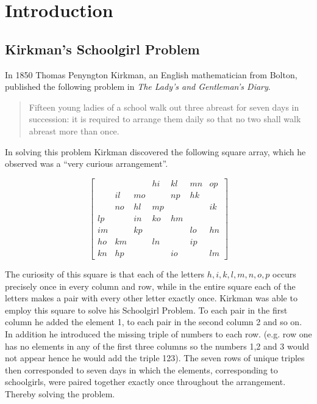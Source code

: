 \chapter{Introduction}
\label{ch:introduction}

\section{Kirkman’s Schoolgirl Problem}

In 1850 Thomas Penyngton Kirkman, an English mathematician from Bolton, published the following problem in \emph{The Lady’s and Gentleman’s Diary}.

\begin{quotation}
Fifteen young ladies of a school walk out three abreast for seven days in succession: it is required to arrange them daily so that no two shall walk abreast more than once.
\end{quotation}

In solving this problem Kirkman discovered the following square array, which he observed was a ``very curious arrangement''.

\begin{equation}
  \begin{bmatrix}
       &    &    & hi & kl & mn & op \\
       & il & mo &    & np & hk &    \\
       & no & hl & mp &    &    & ik \\
    lp &    & in & ko & hm &    &    \\
    im &    & kp &    &    & lo & hn \\
    ho & km &    & ln &    & ip &    \\
    kn & hp &    &    & io &    & lm 
  \end{bmatrix}
  \label{eq:roomsquare}
\end{equation}

The curiosity of this square is that each of the letters
$h, i, k, l, m, n, o, p$
occurs precisely once in every column and row, while in the entire square each of the letters makes a pair with every other letter exactly once.
Kirkman was able to employ this square to solve his Schoolgirl Problem.
To each pair in the first column he added the element 1, to each pair in the second column 2 and so on.
In addition he introduced the missing triple of numbers to each row.
(e.g. row one has no elements in any of the first three columns so the numbers 1,2 and 3 would not appear hence he would add the triple 123).
The seven rows of unique triples then corresponded to seven days in which the elements, corresponding to schoolgirls, were paired together exactly once throughout the arrangement.
Thereby solving the problem.

